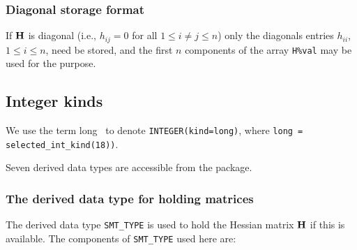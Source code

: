 \documentclass{galahad}
\begin{document}
\subsubsection{Diagonal storage format}\label{diagonal}
If ${\mathbf{H}}$ is diagonal (i.e., $h_{ij} = 0$ for all $1 \leq i \neq j \leq n$)
only the diagonals entries $h_{ii}$, $1 \leq i \leq n$,  need be stored,
and the first $n$ components of the array {\tt H\%val} may be used for
the purpose.


\subsection{Integer kinds}\label{Integer kinds}
We use the term
long \integer\ to denote {\tt INTEGER\-(kind=long)}, where
{\tt long = selected\_int\_kind(18))}.


\galtypes
Seven derived data types are accessible from the package.


\subsubsection{The derived data type for holding matrices}\label{typesmt}
The derived data type {\tt SMT\_TYPE} is used to hold the Hessian matrix ${\mathbf{H}}$
if this is available. The components of {\tt SMT\_TYPE} used here are:
\end{document}
